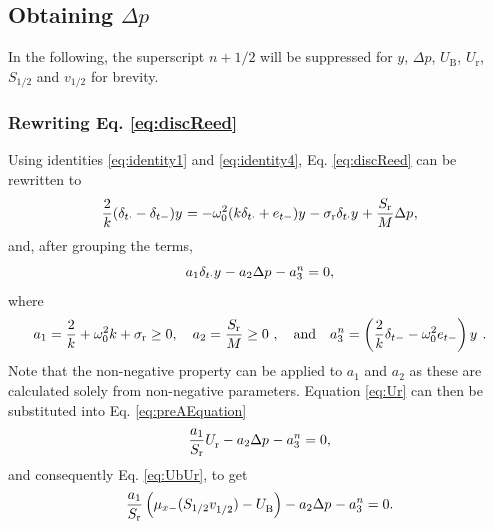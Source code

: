 \subsection{Obtaining $\Delta p$}\label{sec:obtainingDeltaP}
In the following, the superscript $n+1/2$ will be suppressed for $y$, $\Delta p$, $U_\text{B}$, $U_\text{r}$, $S_{1/2}$ and $v_{1/2}$ for brevity. 

\subsubsection{Rewriting Eq. \eqref{eq:discReed}}
Using identities \eqref{eq:identity1} and \eqref{eq:identity4}, Eq. \eqref{eq:discReed} can be rewritten to
\begin{equation*}
    \frac{2}{k} (\delta_{t\cdot} - \delta_{t-})y^{} = -\omega_0^2(k\delta_{t\cdot} + e_{t-})y^{} - \sigma_\text{r}\delta_{t\cdot} y^{} + \frac{S_\text{r}}{M}\Delta p^{},
\end{equation*}
and, after grouping the terms,
\begin{equation}
    a_1\delta_{t\cdot}y^{} - a_2\Delta p^{} - a_3^n = 0,\label{eq:preAEquation}
\end{equation}
where
\begin{equation}\label{eq:aCoeffs}
    a_1 = \frac{2}{k} + \omega_0^2k + \sigma_\text{r} \geq 0, \quad a_2 = \frac{S_\text{r}}{M} \geq 0\ , \quad \text{and} \quad a_3^n = \left(\frac{2}{k} \delta_{t-} - \omega_0^2e_{t-}\right)y^{\nph}\ .
\end{equation}
Note that the non-negative property can be applied to $a_1$ and $a_2$ as these are calculated solely from non-negative parameters. %
Equation \eqref{eq:Ur} can then be substituted into Eq. \eqref{eq:preAEquation}
\begin{equation*}
    \frac{a_1}{S_\text{r}}U_\text{r}^{} - a_2 \Delta p^{} - a_3^n = 0,
\end{equation*}
and consequently Eq. \eqref{eq:UbUr}, to get
\begin{equation}\label{eq:aEquation}
    \frac{a_1}{S_\text{r}}\left(\mu_{x-}(S_{1/2}v_{1/2}^{}) - U_\text{B}^{}\right) - a_2 \Delta p^{} - a_3^n = 0.
\end{equation}
%
